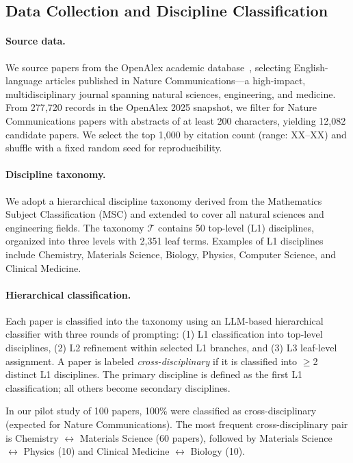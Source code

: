 \documentclass{article}
\begin{document}
\subsection{Data Collection and Discipline Classification}
\label{sec:data}

\paragraph{Source data.}
We source papers from the OpenAlex academic database~\cite{priem2022openalex}, selecting English-language articles published in Nature Communications---a high-impact, multidisciplinary journal spanning natural sciences, engineering, and medicine.
From 277{,}720 records in the OpenAlex 2025 snapshot, we filter for Nature Communications papers with abstracts of at least 200 characters, yielding 12{,}082 candidate papers.
We select the top 1{,}000 by citation count (range: XX--XX) and shuffle with a fixed random seed for reproducibility.

\paragraph{Discipline taxonomy.}
We adopt a hierarchical discipline taxonomy derived from the Mathematics Subject Classification (MSC) and extended to cover all natural sciences and engineering fields.
The taxonomy $\mathcal{T}$ contains 50 top-level (L1) disciplines, organized into three levels with 2{,}351 leaf terms.
Examples of L1 disciplines include Chemistry, Materials Science, Biology, Physics, Computer Science, and Clinical Medicine.

\paragraph{Hierarchical classification.}
Each paper is classified into the taxonomy using an LLM-based hierarchical classifier with three rounds of prompting:
(1) L1 classification into top-level disciplines,
(2) L2 refinement within selected L1 branches, and
(3) L3 leaf-level assignment.
A paper is labeled \emph{cross-disciplinary} if it is classified into $\geq$2 distinct L1 disciplines.
The primary discipline is defined as the first L1 classification; all others become secondary disciplines.

In our pilot study of 100 papers, 100\% were classified as cross-disciplinary (expected for Nature Communications).
The most frequent cross-disciplinary pair is Chemistry $\leftrightarrow$ Materials Science (60 papers), followed by Materials Science $\leftrightarrow$ Physics (10) and Clinical Medicine $\leftrightarrow$ Biology (10).
\end{document}
